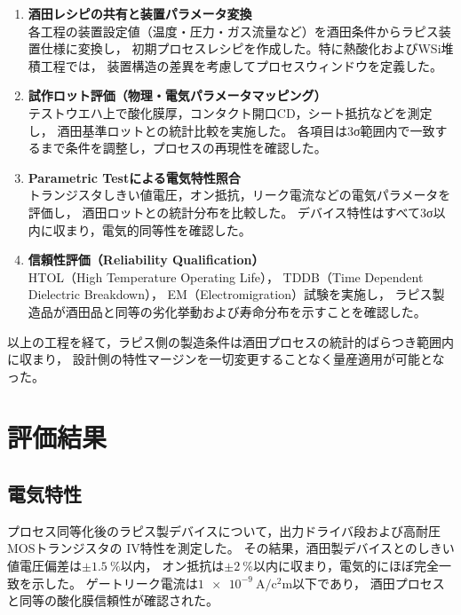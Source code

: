 \documentclass[conference]{IEEEtran}
\begin{document}
\begin{enumerate}
  \item \textbf{酒田レシピの共有と装置パラメータ変換}\\
  各工程の装置設定値（温度・圧力・ガス流量など）を酒田条件からラピス装置仕様に変換し，
  初期プロセスレシピを作成した。特に熱酸化およびWSi堆積工程では，
  装置構造の差異を考慮してプロセスウィンドウを定義した。

  \item \textbf{試作ロット評価（物理・電気パラメータマッピング）}\\
  テストウエハ上で酸化膜厚，コンタクト開口CD，シート抵抗などを測定し，
  酒田基準ロットとの統計比較を実施した。
  各項目は3σ範囲内で一致するまで条件を調整し，プロセスの再現性を確認した。

  \item \textbf{Parametric Testによる電気特性照合}\\
  トランジスタしきい値電圧，オン抵抗，リーク電流などの電気パラメータを評価し，
  酒田ロットとの統計分布を比較した。
  デバイス特性はすべて3σ以内に収まり，電気的同等性を確認した。

  \item \textbf{信頼性評価（Reliability Qualification）}\\
  HTOL（High Temperature Operating Life），
  TDDB（Time Dependent Dielectric Breakdown），
  EM（Electromigration）試験を実施し，
  ラピス製造品が酒田品と同等の劣化挙動および寿命分布を示すことを確認した。
\end{enumerate}

以上の工程を経て，ラピス側の製造条件は酒田プロセスの統計的ばらつき範囲内に収まり，
設計側の特性マージンを一切変更することなく量産適用が可能となった。

\section{評価結果}

\subsection{電気特性}
プロセス同等化後のラピス製デバイスについて，出力ドライバ段および高耐圧MOSトランジスタの
IV特性を測定した。
その結果，酒田製デバイスとのしきい値電圧偏差は$\pm\SI{1.5}{\percent}$以内，
オン抵抗は$\pm\SI{2}{\percent}$以内に収まり，電気的にほぼ完全一致を示した。
ゲートリーク電流は$\SI{1e-9}{\ampere\per\square\centi\meter}$以下であり，
酒田プロセスと同等の酸化膜信頼性が確認された。
\end{document}
